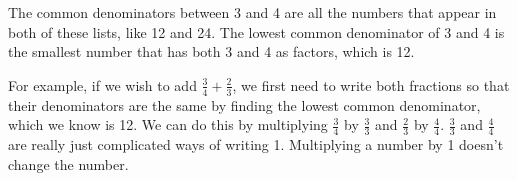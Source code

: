         \label{m38346*id179421}The common denominators between 3 and 4 are all the numbers that appear in both of these lists, like 12 and 24. The lowest common denominator of 3 and 4 is the smallest number that has both 3 and 4 as factors, which is 12.\par 
        \label{m38346*id179428}For example, if we wish to add $\frac{3}{4}+\frac{2}{3}$, we first need to write both fractions so that their denominators are the same by finding the lowest common denominator, which we know is 12. We can do this by multiplying $\frac{3}{4}$ by $\frac{3}{3}$ and $\frac{2}{3}$ by $\frac{4}{4}$. $\frac{3}{3}$ and $\frac{4}{4}$ are really just complicated ways of writing 1. Multiplying a number by 1 doesn't change the number.\par 
        \label{m38346*uid64}\nopagebreak\noindent{}
